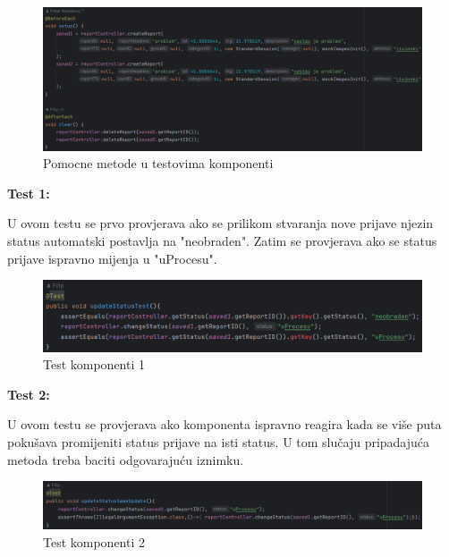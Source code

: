 			\begin{figure}[H]
				\includegraphics[width=\textwidth]{slike/JUnitTestoviPomocneMetode.png} %
				\caption{Pomocne metode u testovima komponenti}
				\label{fig:JUnitTestoviPomocne} %
			\end{figure}
			
			\textbf{Test 1:}
			
			U ovom testu se prvo provjerava ako se prilikom stvaranja nove prijave njezin status automatski postavlja na "neobraden". Zatim se provjerava ako se status prijave ispravno mijenja u "uProcesu".
			
			\begin{figure}[H]
				\includegraphics[width=\textwidth]{slike/JUnitTest1.png} %
				\caption{Test komponenti 1}
				\label{fig:JUnitTest1} %
			\end{figure}
			
			\textbf{Test 2:}
			
			U ovom testu se provjerava ako komponenta ispravno reagira kada se više puta pokušava promijeniti status prijave na isti status. U tom slučaju pripadajuća metoda treba baciti odgovarajuću iznimku.
			
			\begin{figure}[H]
				\includegraphics[width=\textwidth]{slike/JUnitTest2.png} %
				\caption{Test komponenti 2}
				\label{fig:JUnitTest2} %
			\end{figure}
			
